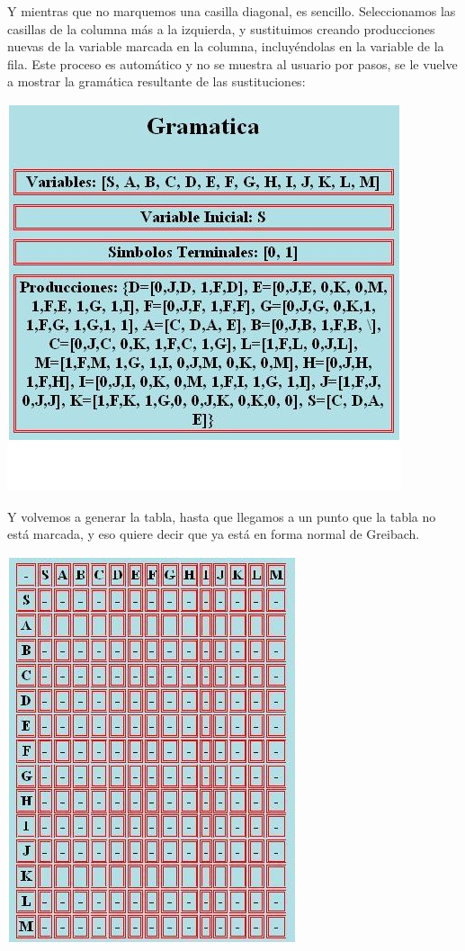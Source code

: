 \documentclass[12pt,a4paper,spanish]{book}
\begin{document}
\newpage
Y mientras que no marquemos una casilla diagonal, es sencillo. Seleccionamos las casillas de la columna m\'as a la izquierda, y sustituimos creando producciones nuevas de la variable marcada en la columna, incluy\'endolas en la variable de la fila. Este proceso es autom\'atico y no se muestra al usuario por pasos, se le vuelve a mostrar la gram\'atica resultante de las sustituciones:\\
\newline
\begin{center}
\includegraphics{gram3.jpg}
\end{center}

\newpage
Y volvemos a generar la tabla, hasta que llegamos a un punto que la tabla no est\'a marcada, y eso quiere decir que ya est\'a en forma normal de Greibach.\\
\newline

\begin{center}
\includegraphics{gram4.jpg}
\end{center}
\end{document}
